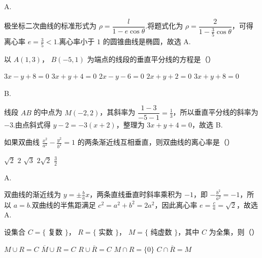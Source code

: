 \documentclass[UTF8,a4paper,oneside,11pt]{ctexbook}
\begin{document}
\begin{answer}
A.
\end{answer}

\begin{solution}
极坐标二次曲线的标准形式为 \(\rho=\dfrac{l}{1-e\cos\theta}\).将题式化为 \(\rho=\dfrac{2}{1-\frac35\cos\theta}\)，可得离心率 \(e=\frac35<1\).离心率小于 \(1\) 的圆锥曲线是椭圆，故选 A.
\end{solution}

\begin{problem}

以 \(A(1,3) \)， \(B(-5,1) \) 为端点的线段的垂直平分线的方程是（\quad）

\choicesfive
    {\(3x - y + 8 = 0 \)}
    {\(3x + y + 4 = 0 \)}
    {\(2x - y - 6 = 0\)}
    {\(2x + y + 2 = 0 \)}
    {\(3x + y + 8 = 0 \)}
\end{problem}

\begin{answer}
B.
\end{answer}

\begin{solution}
线段 \(AB\) 的中点为 \(M(-2,2)\)，其斜率为 \(\dfrac{1-3}{-5-1}=\frac13\)，所以垂直平分线的斜率为 \(-3\).由点斜式得 \(y-2=-3(x+2)\)，整理为 \(3x+y+4=0\)，故选 B.
\end{solution}

\begin{problem}

如果双曲线 \(\frac{x^{2}}{a^{2}} - \frac{y^{2}}{b^{2}} = 1 \) 的两条渐近线互相垂直，则双曲线的离心率是（\quad）

\choicesfive
    {\(\sqrt{2} \)}
    {\(2\)}
    {\(\sqrt{3} \)}
    {\(2\sqrt{2} \)}
    {\(\frac{3}{2} \)}
\end{problem}

\begin{answer}
A.
\end{answer}

\begin{solution}
双曲线的渐近线为 \(y=\pm\frac ba x\)，两条直线垂直时斜率乘积为 \(-1\)，即 \(-\frac{b^{2}}{a^{2}}=-1\)，所以 \(a=b\).双曲线的半焦距满足 \(c^{2}=a^{2}+b^{2}=2a^{2}\)，因此离心率 \(e=\frac ca=\sqrt2\)，故选 A.
\end{solution}

\begin{problem}

设集合 \(C = \{ \) 复数 \(\} \)， \(R = \{ \) 实数 \(\} \)， \(M = \{ \) 纯虚数 \(\} \)，其中 \(C\) 为全集，则（\quad）

\choicesfive
    {\(M \cup R = C \)}
    {\(\overline{M} \cup R = C \)}
    {\(R \cup \overline{R} = C \)}
    {\(M \cap R = \{0\} \)}
    {\(C \cap \overline{R} = M \)}
\end{problem}
\end{document}
